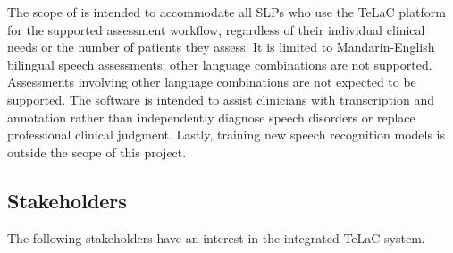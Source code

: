 \documentclass[12pt]{article}
\begin{document}
The scope of \progname{} is intended to accommodate all SLPs who use the TeLaC platform for the supported assessment workflow, regardless of their individual clinical needs or the number of patients they assess. It is 
limited to Mandarin-English bilingual speech assessments; other language combinations are not supported. Assessments involving other language combinations are not expected to be supported. The software is intended to assist clinicians with transcription and annotation rather than independently diagnose speech disorders or replace professional clinical judgment.
Lastly, training new speech recognition models is outside the scope of this project.                                    

\subsection{Stakeholders}

The following stakeholders have an interest in the integrated TeLaC system.
\end{document}
